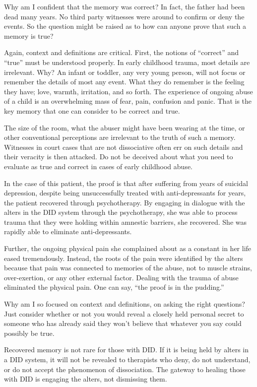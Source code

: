 \documentclass[]{book}
\begin{document}
Why am I confident that the memory was correct? In fact, the father had been dead many years. No third party witnesses were around to confirm or deny the events. So the question might be raised as to how can anyone prove that such a memory is true?

Again, context and definitions are critical. First, the notions of ``correct'' and ``true'' must be understood properly. In early childhood trauma, most details are irrelevant. Why? An infant or toddler, any very young person, will not focus or remember the details of most any event. What they do remember is the feeling they have; love, warmth, irritation, and so forth. The experience of ongoing abuse of a child is an overwhelming mass of fear, pain, confusion and panic. That is the key memory that one can consider to be correct and true.

The size of the room, what the abuser might have been wearing at the time, or other conventional perceptions are irrelevant to the truth of such a memory. Witnesses in court cases that are not dissociative often err on such details and their veracity is then attacked. Do not be deceived about what you need to evaluate as true and correct in cases of early childhood abuse.

In the case of this patient, the proof is that after suffering from years of suicidal depression, despite being unsuccessfully treated with anti-depressants for years, the patient recovered through psychotherapy. By engaging in dialogue with the alters in the DID system through the psychotherapy, she was able to process trauma that they were holding within amnestic barriers, she recovered. She was rapidly able to eliminate anti-depressants.

Further, the ongoing physical pain she complained about as a constant in her life eased tremendously. Instead, the roots of the pain were identified by the alters because that pain was connected to memories of the abuse, not to muscle strains, over-exertion, or any other external factor. Dealing with the trauma of abuse eliminated the physical pain. One can say, ``the proof is in the pudding.''

Why am I so focused on context and definitions, on asking the right questions? Just consider whether or not you would reveal a closely held personal secret to someone who has already said they won't believe that whatever you say could possibly be true.

Recovered memory is not rare for those with DID. If it is being held by alters in a DID system, it will not be revealed to therapists who deny, do not understand, or do not accept the phenomenon of dissociation. The gateway to healing those with DID is engaging the alters, not dismissing them.
\end{document}
